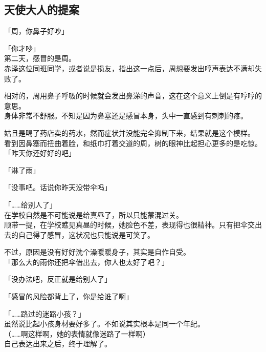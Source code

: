 \subsection{天使大人的提案}

「周，你鼻子好吵」

「你才吵」\\

第二天，感冒的是周。\\

赤泽这位同班同学，或者说是损友，指出这一点后，周想要发出哼声表达不满却失败了。

相对的，周用鼻子呼吸的时候就会发出鼻涕的声音，这在这个意义上倒是有哼哼的意思。\\

身体非常不舒服。不知是因为鼻塞还是感冒本身，头中一直感到有刺刺的疼。

姑且是喝了药店卖的药水，然而症状并没能完全抑制下来，结果就是这个模样。\\

看到因鼻塞而扭曲着脸，和纸巾打着交道的周，树的眼神比起担心更多的是吃惊。\\

「昨天你还好好的吧」

「淋了雨」

「没事吧。话说你昨天没带伞吗」

「……给别人了」\\

在学校自然是不可能说是给真昼了，所以只能蒙混过关。\\

顺带一提，在学校瞧见真昼的时候，她脸色不差，表现得也很精神。只有把伞交出去的自己得了感冒，这状况也只能说是可笑了。

不过，原因是没有好好洗个澡暖暖身子，其实是自作自受。\\

「那么大的雨你还把伞借出去，你人也太好了吧？」

「没办法吧，反正就是给别人了」

「感冒的风险都背上了，你是给谁了啊」

「……路过的迷路小孩？」\\

虽然说比起小孩身材要好多了。不如说其实根本是同一个年纪。\\

（……啊这样啊，她的表情就像迷路了一样啊）\\

自己表达出来之后，终于理解了。

